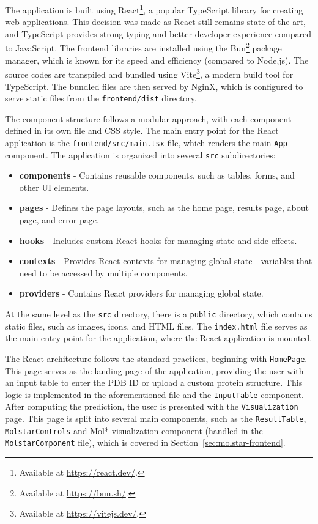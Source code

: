 The application is built using React\footnote{Available at \url{https://react.dev/}.}, a popular TypeScript library for creating web applications. This decision was made as React still remains state-of-the-art, and TypeScript provides strong typing and better developer experience compared to JavaScript. The frontend libraries are installed using the Bun\footnote{Available at \url{https://bun.sh/}.} package manager, which is known for its speed and efficiency (compared to Node.js). The source codes are transpiled and bundled using Vite\footnote{Available at \url{https://vitejs.dev/}.}, a modern build tool for TypeScript. The bundled files are then served by NginX, which is configured to serve static files from the \lstinline|frontend/dist| directory.

The component structure follows a modular approach, with each component defined in its own file and CSS style. The main entry point for the React application is the \lstinline|frontend/src/main.tsx| file, which renders the main \lstinline|App| component. The application is organized into several \lstinline|src| subdirectories:

\begin{itemize}
    \item \textbf{components} - Contains reusable components, such as tables, forms, and other UI elements.
    \item \textbf{pages} - Defines the page layouts, such as the home page, results page, about page, and error page.
    \item \textbf{hooks} - Includes custom React hooks for managing state and side effects.
    \item \textbf{contexts} - Provides React contexts for managing global state - variables that need to be accessed by multiple components.
    \item \textbf{providers} - Contains React providers for managing global state.
\end{itemize}

At the same level as the \lstinline|src| directory, there is a \lstinline|public| directory, which contains static files, such as images, icons, and HTML files. The \lstinline|index.html| file serves as the main entry point for the application, where the React application is mounted.

The React architecture follows the standard practices, beginning with \lstinline|HomePage|. This page serves as the landing page of the application, providing the user with an input table to enter the PDB ID or upload a custom protein structure. This logic is implemented in the aforementioned file and the \lstinline|InputTable| component. After computing the prediction, the user is presented with the \lstinline|Visualization| page. This page is split into several main components, such as the \lstinline|ResultTable|, \lstinline|MolstarControls| and Mol* visualization component (handled in the \lstinline|MolstarComponent| file), which is covered in Section~\ref{sec:molstar-frontend}.

